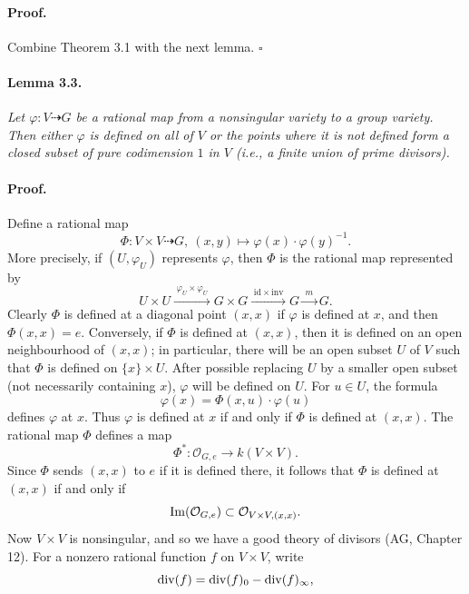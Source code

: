\paragraph{Proof.}
Combine Theorem 3.1 with the next lemma. \hfill $\square$

\paragraph{Lemma 3.3.}
\textit{Let $\varphi \colon V \dashrightarrow G$ be a rational map from a
nonsingular variety to a group variety. Then either $\varphi$ is defined on
all of $V$ or the points where it is not defined form a closed subset of
pure codimension $1$ in $V$ (i.e., a finite union of prime divisors).}

\paragraph{Proof.}
Define a rational map
\[
  \Phi \colon V \times V \dashrightarrow G, \ (x, y) \mapsto
    \varphi(x) \cdot \varphi(y)^{-1}.
\]
More precisely, if $(U, \varphi_U)$ represents $\varphi$, then $\Phi$ is the
rational map represented by
\[
  U \times U \xrightarrow{\;\varphi_U \times \varphi_U\;} G \times G
    \xrightarrow{\;\mathrm{id} \times \mathrm{inv}\;} G
    \xrightarrow{\;m\;} G.
\]
Clearly $\Phi$ is defined at a diagonal point $(x, x)$ if $\varphi$ is
defined at $x$, and then $\Phi(x, x) = e$. Conversely, if $\Phi$ is defined
at $(x, x)$, then it is defined on an open neighbourhood of $(x, x)$; in
particular, there will be an open subset $U$ of $V$ such that $\Phi$ is
defined on $\{x\} \times U$. After possible replacing $U$ by a smaller open
subset (not necessarily containing $x$), $\varphi$ will be defined on $U$.
For $u \in U$, the formula
\[
  \varphi(x) = \Phi(x, u) \cdot \varphi(u)
\]
defines $\varphi$ at $x$. Thus $\varphi$ is defined at $x$ if and only if
$\Phi$ is defined at $(x, x)$. The rational map $\Phi$ defines a map
\[
  \Phi^* \colon \mathcal{O}_{G,e} \to k(V \times V).
\]
Since $\Phi$ sends $(x, x)$ to $e$ if it is defined there, it follows that
$\Phi$ is defined at $(x, x)$ if and only if
\[
  \operatorname{Im}(\mathcal{O}_{G,e}) \subset \mathcal{O}_{V \times V, (x,x)}.
\]
Now $V \times V$ is nonsingular, and so we have a good theory of divisors
(AG, Chapter 12). For a nonzero rational function $f$ on $V \times V$, write
\[
  \operatorname{div}(f) = \operatorname{div}(f)_0 - \operatorname{div}(f)_{\infty},
\]
